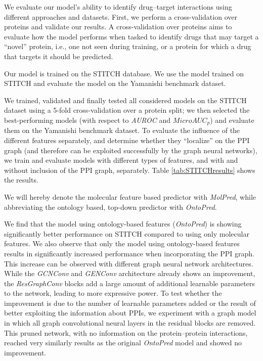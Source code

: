 \documentclass{bioinfo}
\begin{document}
We evaluate our model's ability to identify drug--target interactions
using different approaches and datasets.  First, we perform a
cross-validation over proteins and validate our results. A
cross-validation over proteins aims to evaluate how the model performs
when tasked to identify drugs that may target a ``novel'' protein,
i.e., one not seen during training, or a protein for which a drug that
targets it should be predicted.  

Our model is trained on the STITCH database. We use the model trained
on STITCH and evaluate the model on the Yamanishi benchmark
dataset.

We trained, validated and finally tested all considered models on the
STITCH dataset using a 5-fold cross-validation over a protein
split; we then selected the best-performing models (with respect to
\textit{AUROC} and $MicroAUC_p$) and evaluate them on the Yamanishi
benchmark dataset. To evaluate the influence of the different
features separately, and determine whether they ``localize'' on the
PPI graph (and therefore can be exploited successfully by the graph
neural networks), we train and evaluate models with different types of
features, and with and without inclusion of the PPI graph,
separately.
Table \ref{tab:STITCHresults} shows the results.

We will hereby denote the molecular feature based predictor with
\textit{MolPred}, while abbreviating the ontology based, top-down
predictor with \textit{OntoPred}.

We find that the model using ontology-based features
(\textit{OntoPred}) is showing significantly better performance on STITCH compared
to using only molecular features. We also observe that only the model
using ontology-based features results in significantly
increased performance when incorporating the PPI graph.  This increase
can be observed with different graph neural network
architectures. While the {\em GCNConv} and
{\em GENConv} architecture already shows an improvement, the
\textit{ResGraphConv} blocks add a large amount of additional
learnable parameters to the network, leading to more expressive
power. To test whether the improvement is due to the number of
learnable parameters added or the result of better exploiting the
information about PPIs, we experiment with a graph model in which all
graph convolutional neural layers in the residual blocks are
removed. This pruned network, with
no information on the protein--protein interactions, reached very
similarly results as the original \textit{OntoPred} model and showed no
improvement.
\end{document}
